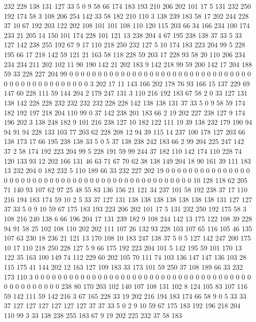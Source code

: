 232 228 138 131 127 33 5 0 9 58 66 174 183 193 210 206 202 101 17 5
131 232 250 192 174 58 3 108 206 254 142 33 58 182 210 110 3 138 239 183
58 17 202 244 228 37 10 67 192 203 122 202 108 101 101 108 110 120 115 203
66 34 166 234 100 174 233 21 205 14 150 101 174 228 101 121 13 238 204 4
67 195 238 138 37 33 5 33 127 142 238 255 192 67 9 17 110 218 250 232
127 5 10 174 183 223 204 99 5 228 195 66 17 218 142 59 121 21 163 58
118 228 59 203 17 228 93 58 20 110 206 234 234 234 211 202 102 11 90 190
142 21 202 183 9 142 218 99 59 200 142 17 204 188 59 33 228 227 204 99
0 0 0 0 0 0 0 0 0 0 0 0 0 0 0 0 0 0 0 0
0 0 0 0 0 0 0 0 0 0 0 0 0 0 0 0 0 0 0 0
0 0 0 0 0 0 0 3 202 17 11 143 166 202 178 76 93 166 15 137
229 69 147 60 228 111 59 144 204 2 179 247 131 3 110 216 192 183 67 58
2 0 33 127 131 138 142 228 228 232 232 232 232 228 228 142 138 138 131 37
33 5 0 9 58 59 174 182 192 197 218 204 110 99 0 37 142 238 201 183
66 2 19 202 227 238 127 9 174 196 202 3 138 248 182 9 101 216 238 127
10 182 122 111 19 39 138 232 179 190 94 94 91 94 228 133 103 77 203 62
228 208 12 94 39 115 14 237 100 178 127 203 66 138 173 17 66 195 238 138
33 5 0 5 37 138 238 242 183 66 2 99 204 225 247 142 37 2 58 174
192 223 204 99 5 228 191 59 99 244 37 182 110 142 174 110 228 74 120 133
93 12 202 166 131 46 63 71 67 70 62 38 138 149 204 18 90 161 39 111
183 13 232 204 0 182 232 5 110 189 66 33 232 227 202 19 0 0 0 0
0 0 0 0 0 0 0 0 0 0 0 0 0 0 0 0 0 0 0 0
0 0 0 0 0 0 0 0 0 0 0 0 0 0 0 0 0 0 0 0
0 0 0 0 10 128 118 62 205 71 140 93 107 62 97 25 48 55 83 136
156 21 121 34 237 101 58 192 238 37 17 110 216 194 183 174 59 10 2 5
33 37 127 131 138 138 138 138 138 138 138 131 127 127 37 33 5 0 9 10
59 67 175 183 193 223 206 202 101 17 5 131 232 250 192 175 58 3 108 216
240 138 6 66 196 204 17 131 239 182 9 108 244 142 13 175 122 108 39 228
94 91 58 25 102 108 110 202 202 111 107 26 132 93 228 103 107 65 116 105
46 135 107 63 230 18 236 21 121 13 170 108 10 183 247 138 37 5 0 5
127 142 247 200 175 10 17 110 218 250 228 127 5 9 66 175 192 223 204 101
5 142 195 59 101 170 13 122 35 163 100 149 74 112 229 60 202 105 70 111
74 103 136 147 147 136 103 28 115 175 41 144 202 12 163 127 109 183 33 173
101 59 250 37 108 189 66 33 232 173 110 3 0 0 0 0 0 0 0 0
0 0 0 0 0 0 0 0 0 0 0 0 0 0 0 0 0 0 0 0
0 0 0 0 0 0 0 0 0 0 0 0 0 0 0 0 0 0 0 0
238 80 170 203 102 140 107 108 131 102 8 124 105 83 107 116 59 142 111 59
142 216 3 67 165 228 33 19 202 216 194 183 174 66 58 9 0 5 33 33
37 127 127 127 127 127 127 37 37 33 5 0 2 9 10 59 67 175 183 192
196 218 204 110 99 3 33 138 238 255 183 67 9 19 202 225 232 37 58 183
